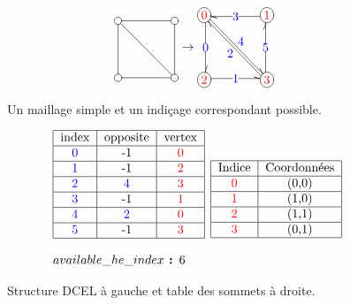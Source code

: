 \documentclass[]{article}
\begin{document}
	\begin{figure}[!h]
		\[
	\begin{aligned}[c]
		\entrymodifiers={+[o][F]}
		\renewcommand{\labelstyle}{\textstyle}
		\xymatrix@=4em @L=.25ex{
			{}
			\ar @^{-} [d]
			\ar @^{-} [dr]
			& {}
			\ar @^{-} [l]
			\\ {}
			\ar @^{-} [r]
			& {}
			\ar @^{-} [u]
		}
	\end{aligned}
	\rightarrow
	\begin{aligned}[c]
		\entrymodifiers={+[o][F]}
		\renewcommand{\labelstyle}{\textstyle}
		\xymatrix@=4em @L=.25ex{
			{\color{red}0}
			\ar @<.25ex> @^{->} [d] |{\color{blue}0}
			\ar @<.25ex> @^{->} [dr] ^{\color{blue}4}
			& {\color{red}1}
			\ar @<.25ex> @^{->} [l] |{\color{blue}3}
			\\ {\color{red}2}
			\ar @<.25ex> @^{->} [r] |{\color{blue}1}
			& {\color{red}3}
			\ar @<.25ex> @^{->} [ul] ^{\color{blue}2}
			\ar @<.25ex> @^{->} [u] |{\color{blue}5}
		}
	\end{aligned}
		\]
		\caption{Un maillage simple et un indiçage correspondant possible.}
		\label{maillage_simple}
	\end{figure}

	\begin{figure}[!h]
		\[
		\begin{aligned}[c]
			\begin{array}{l}
				\begin{tabular}{|c|c|c|c|}
					\hline
					index & opposite & vertex \\
					\hline
					\color{blue}0 & -1 & \color{red}0 \\
					\hline
					\color{blue}1 & -1 & \color{red}2 \\
					\hline
					\color{blue}2 & \color{blue}4 & \color{red}3 \\
					\hline
					\color{blue}3 & -1 & \color{red}1 \\
					\hline
					\color{blue}4 & \color{blue}2 & \color{red}0 \\
					\hline
					\color{blue}5 & -1 & \color{red}3 \\
					\hline
				\end{tabular}\\\\
				available\_he\_index\textbf{ : }6
			\end{array}
		\end{aligned}
		\begin{aligned}[c]
			\begin{tabular}{|c|c|}
				\hline
				Indice & Coordonnées \\
				\hline
				\color{red}0 & (0,0) \\
				\hline
				\color{red}1 & (1,0) \\
				\hline
				\color{red}2 & (1,1) \\
				\hline
				\color{red}3 & (0,1) \\
				\hline
			\end{tabular}
		\end{aligned}
		\]
		\caption{Structure DCEL à gauche et table des sommets à droite.}
		\label{maillage_simple_struct_associee}
	\end{figure}
\end{document}
